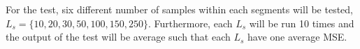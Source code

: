 For the test, six different number of samples within each segments will be tested, $L_s = \{ 10, 20, 30, 50, 100, 150, 250 \}$. Furthermore, each $L_s$ will be run 10 times and the output of the test will be average such that each $L_s$ have one average MSE.

